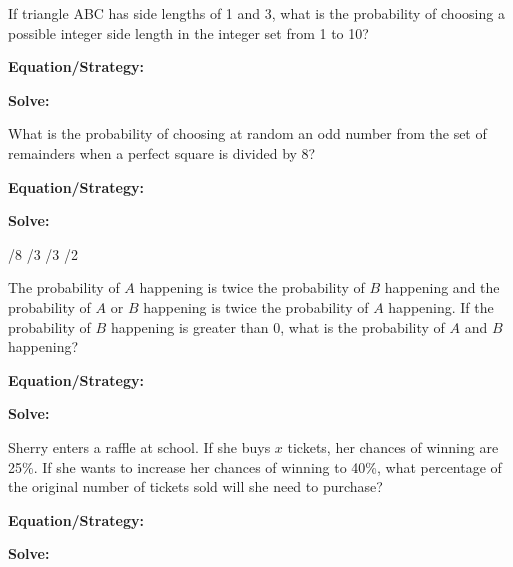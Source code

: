 \vfill
\newpage
\begin{multicols*}{2}
\begin{outline}[enumerate]
\medium

\1 If triangle ABC has side lengths of 1 and 3, what is the probability of choosing a possible integer side length in the integer set from 1 to 10?

\bigskip
\textbf{Equation/Strategy:} \hrulefill

\bigskip
\textbf{Solve:}

\vfill
{}

\midline

\1 What is the probability of choosing at random an odd number from the set of remainders when a perfect square is divided by 8?

\bigskip
\textbf{Equation/Strategy:} \hrulefill

\bigskip
\textbf{Solve:}

\vfill
{}
/8
/3
/3
/2

\columnbreak
\advanced

\1 The probability of $A$ happening is twice the probability of $B$ happening and the probability of $A$ or $B$ happening is twice the probability of $A$ happening. If the probability of $B$ happening is greater than 0, what is the probability of $A$ and $B$ happening?

\bigskip
\textbf{Equation/Strategy:} \hrulefill

\bigskip
\textbf{Solve:}

\vfill
{}

\midline

\1 Sherry enters a raffle at school. If she buys $x$ tickets, her chances of winning are 25\%. If she wants to increase her chances of winning to 40\%, what percentage of the original number of tickets sold will she need to purchase?

\bigskip
\textbf{Equation/Strategy:}

\bigskip
\textbf{Solve:}

\vfill
\2
\2
\2
\2
\2
\end{outline}
\end{multicols*}